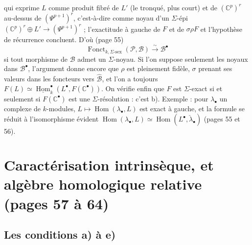 \documentclass[11pt,a4paper]{article}
\begin{document}

qui exprime $L$ comme produit fibré de $L'$ (le tronqué, plus court) et de
$(\mathbb{C}^{p})^{r}$ au-dessus de $(\Psi^{p+1})^{r}$, c'est-à-dire comme
noyau d'un $\Sigma$-épi $(\mathbb{C}^{p})^{r} \oplus L' \to
(\Psi^{p+1})^{r}$ ; l'exactitude à gauche de $F$ et de $\sigma\rho F$ et
l'hypothèse de récurrence concluent. D'où (page 55)
\[
  \operatorname{Fonct}_{k, \Sigma\text{-sex}}(\mathcal{P}, \mathcal{B})
  \xrightarrow{\ \sim\ } \mathcal{B}^{\bullet}
\]
si tout morphisme de $\mathcal{B}$ admet un $\Sigma$-noyau. Si l'on suppose
seulement les noyaux dans $\mathcal{B}^{\bullet}$, l'argument donne encore
que $\rho$ est pleinement fidèle, $\sigma$ prenant ses valeurs dans les
foncteurs vers $\widehat{\mathcal{B}}$, et l'on a toujours
$F(L) \simeq \underline{\operatorname{Hom}}^{\bullet}_{k}(L^{\bullet},
F(\mathbb{C}^{\bullet}))$. On vérifie enfin que $F$ est $\Sigma$-exact si et
seulement si $F(\mathbb{C}^{\bullet})$ est une $\Sigma$-résolution : c'est
b). Exemple : pour $\lambda_{\bullet}$ un complexe de $k$-modules, $L \mapsto
\operatorname{Hom}(\lambda_{\bullet}, L)$ est exact à gauche, et la formule
se réduit à l'isomorphisme évident $\operatorname{Hom}(\lambda_{\bullet},
L) \simeq \operatorname{Hom}(L^{\bullet}, \check{\lambda}_{\bullet})$ (pages
55 et 56).

\section*{Caractérisation intrinsèque, et algèbre homologique relative (pages 57 à 64)}

\subsection*{Les conditions a) à e)}
\end{document}
